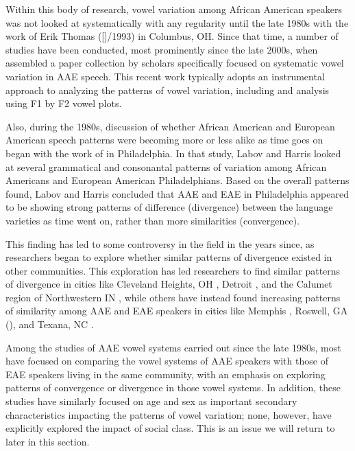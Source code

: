 \documentclass[output=paper,colorlinks,citecolor=brown]{langscibook}
\begin{document}
Within this body of research, vowel variation among African American speakers was not looked at systematically with any regularity until the late 1980s with the work of Erik Thomas ([\citeyear{Thomas1989vowel}]/1993) in Columbus, OH. Since that time, a number of studies have been conducted, most prominently since the late 2000s, when \citet{thomas_yaegerdror2010} assembled a paper collection by scholars specifically focused on systematic vowel variation in AAE speech. This recent work typically adopts an instrumental approach to analyzing the patterns of vowel variation, including and analysis using F1 by F2 vowel plots.

 Also, during the 1980s, discussion of whether African American and European American speech patterns were becoming more or less alike as time goes on began with the work of \citet{LabovHarris1986} in Philadelphia. In that study, Labov and Harris looked at several grammatical and consonantal patterns of variation among African Americans and European American Philadelphians. Based on the overall patterns found, Labov and Harris concluded that AAE and EAE in Philadelphia appeared to be showing strong patterns of difference (divergence) between the language varieties as time went on, rather than more similarities (convergence).

  This finding has led to some controversy in the field in the years since, as researchers began to explore whether similar patterns of divergence existed in other communities. This exploration has led researchers to find similar patterns of divergence in cities like Cleveland Heights, OH \citep{Thomas2007phonological}, Detroit \citep{anderson2002dialect}, and the Calumet region of Northwestern IN \citep{Gordon2000}, while others have instead found increasing patterns of similarity among AAE and EAE speakers in cities like Memphis \citep{FridlandBartlett2006,fridland2003network}, Roswell, GA (\citealt{andres2009african}), and Texana, NC \citep{childscarpenter2010}.

  Among the studies of AAE vowel systems carried out since the late 1980s, most have focused on comparing the vowel systems of AAE speakers with those of EAE speakers living in the same community, with an emphasis on exploring patterns of convergence or divergence in those vowel systems. In addition, these studies have similarly focused on age and sex as important secondary characteristics impacting the patterns of vowel variation; none, however, have explicitly explored the impact of social class. This is an issue we will return to later in this section.
\end{document}
